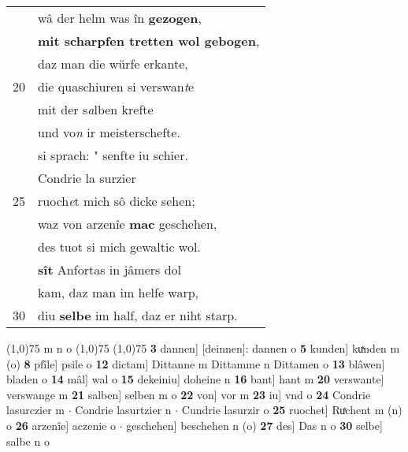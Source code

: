 \documentclass[8pt,a4paper,notitlepage]{article}
\begin{document}
\begin{table}[ht]
\begin{minipage}[t]{0.5\linewidth}
\begin{tabular}{rl}
 & wâ der helm was în \textbf{gezogen},\\ 
 & \textbf{mit scharpfen tretten wol gebogen},\\ 
 & daz man die würfe erkante,\\ 
20 & die quaschiuren si verswan\textit{t}e\\ 
 & mit der s\textit{a}lben krefte\\ 
 & und vo\textit{n} ir meisterschefte.\\ 
 & si sprach: " senfte iu schier.\\ 
 & Condrie la surzier\\ 
25 & ruoch\textit{e}t mich sô dicke sehen;\\ 
 & waz von arzenîe \textbf{mac} geschehen,\\ 
 & des tuot si mich gewaltic wol.\\ 
 & \textbf{sît} Anfortas in jâmers dol\\ 
 & kam, daz man im helfe warp,\\ 
30 & diu \textbf{selbe} im half, daz er niht starp.\\ 
\end{tabular}
\scriptsize
\line(1,0){75} \newline
m n o \newline
\line(1,0){75} \newline
\newline
\line(1,0){75} \newline
\textbf{3} dannen] [deinnen]: dannen o \textbf{5} kunden] kuͯnden m (o) \textbf{8} pfîle] psile o \textbf{12} dictam] Dittanne m Dittamme n Dittamen o \textbf{13} blâwen] bladen o \textbf{14} mâl] wal o \textbf{15} dekeiniu] doheine n \textbf{16} bant] hant m \textbf{20} verswante] verswange m \textbf{21} salben] selben m o \textbf{22} von] vor m \textbf{23} iu] vnd o \textbf{24} Condrie lasurczier m  $\cdot$ Condrie lasurtzier n  $\cdot$ Cundrie lasurzir o \textbf{25} ruochet] Ruͯchent m (n) o \textbf{26} arzenîe] aczenie o  $\cdot$ geschehen] beschehen n (o) \textbf{27} des] Das n o \textbf{30} selbe] salbe n o \newline
\end{minipage}
\end{table}
\newpage
\end{document}
